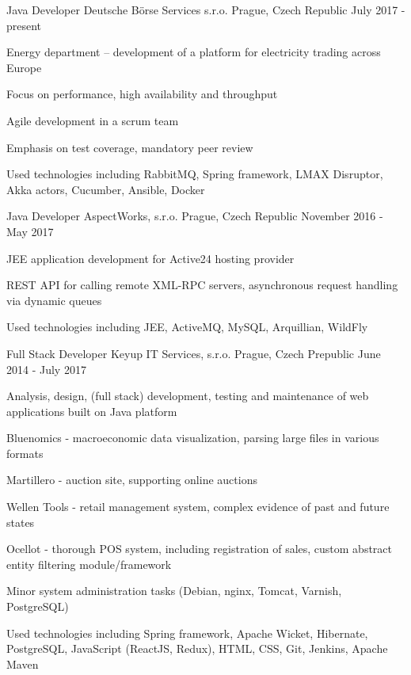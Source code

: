 \begin{cventries}
  \cventry
	{Java Developer}
	{Deutsche Börse Services s.r.o.}
	{Prague, Czech Republic}
	{July 2017 - present}
	{
	  \begin{cvitems}
	    \item {Energy department -- development of a platform for electricity trading across Europe}
	    \item {Focus on performance, high availability and throughput}
	    \item {Agile development in a scrum team}
	    \item {Emphasis on test coverage, mandatory peer review}
	    \item {Used technologies including RabbitMQ, Spring framework, LMAX Disruptor, Akka actors, Cucumber, Ansible, Docker}
	  \end{cvitems}
	}
  \cventry
    {Java Developer}
    {AspectWorks, s.r.o.}
    {Prague, Czech Republic}
    {November 2016 - May 2017}
    {
      \begin{cvitems}
        \item {JEE application development for Active24 hosting provider}
        \item {REST API for calling remote XML-RPC servers, asynchronous request handling via dynamic queues}
        \item {Used technologies including JEE, ActiveMQ, MySQL, Arquillian, WildFly}
      \end{cvitems}
    }
  \cventry
    {Full Stack Developer}
    {Keyup IT Services, s.r.o.}
    {Prague, Czech Prepublic}
    {June 2014 - July 2017}
    {
      \begin{cvitems}
        \item {Analysis, design, (full stack) development, testing and maintenance of web applications built on Java platform}
        \item {Bluenomics - macroeconomic data visualization, parsing large files in various formats}
        \item {Martillero - auction site, supporting online auctions}
        \item {Wellen Tools - retail management system, complex evidence of past and future states}
        \item {Ocellot - thorough POS system, including registration of sales, custom abstract entity filtering module/framework}
        \item {Minor system administration tasks (Debian, nginx, Tomcat, Varnish, PostgreSQL)}
        \item {Used technologies including Spring framework, Apache Wicket, Hibernate, PostgreSQL, JavaScript (ReactJS, Redux), HTML, CSS, Git, Jenkins, Apache Maven}
      \end{cvitems}
    }
\end{cventries}
